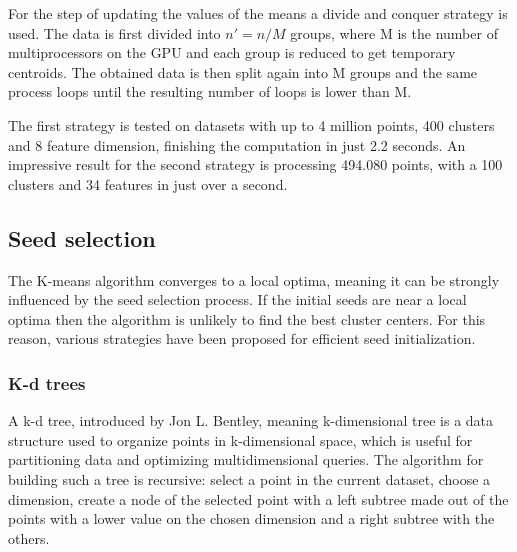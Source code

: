 \documentclass[12pt]{article}
\begin{document}
	For the step of updating the values of the means a divide and conquer strategy is used. The data is first divided into \(n'=n/M\) groups, where M is the number of multiprocessors on the GPU and each group is reduced to get temporary centroids. The obtained data is then split again into M groups and the same process loops until the resulting number of loops is lower than M.
	
	The first strategy is tested on datasets with up to 4 million points, 400 clusters and 8 feature dimension, finishing the computation in just 2.2 seconds. An impressive result for the second strategy is processing 494.080 points, with a 100 clusters and 34 features in just over a second.
	
	\subsection{Seed selection}
	The K-means algorithm converges to a local optima\cite{AlgorithmsForClusteringData}, meaning it can be strongly influenced by the seed selection process. If the initial seeds are near a local optima then the algorithm is unlikely to find the best cluster centers. For this reason, various strategies have been proposed for efficient seed initialization.
	
	\subsubsection{K-d trees}
	A k-d tree, introduced by Jon L. Bentley\cite{KdTree}, meaning k-dimensional tree is a data structure used to organize points in k-dimensional space, which is useful for partitioning data and optimizing multidimensional queries. The algorithm for building such a tree is recursive: select a point in the current dataset, choose a dimension, create a node of the selected point with a left subtree made out of the points with a lower value on the chosen dimension and a right subtree with the others.
	
\end{document}
